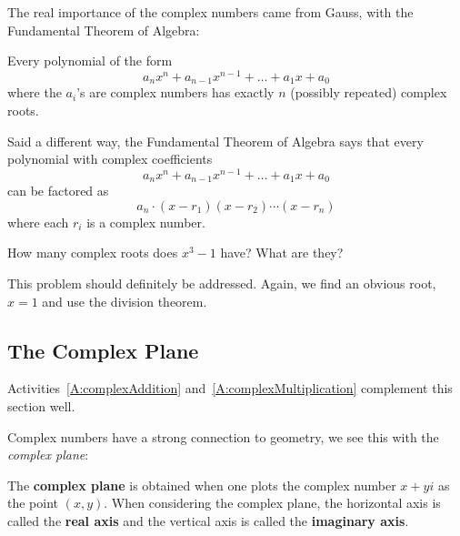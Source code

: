 The real importance of the complex numbers came from
Gauss, with the Fundamental Theorem of Algebra:

\begin{theorem}
 Every polynomial of the form
\[
 a_n x^n + a_{n-1} x^{n-1} + \dots + a_1 x + a_0
\]
where the $a_i$'s are complex numbers has exactly $n$ (possibly
repeated) complex roots.
\end{theorem}

Said a different way, the Fundamental Theorem of Algebra says that
every polynomial with complex coefficients
\[
a_n x^n + a_{n-1} x^{n-1} + \dots + a_1 x + a_0
\]
can be factored as 
\[
a_n\cdot (x-r_1)(x-r_2) \cdots (x-r_n)
\]
where each $r_i$ is a complex number.

\begin{question} 
How many complex roots does $x^3-1$ have? What are they?
\end{question}
\QM

\begin{teachingnote}
This problem should definitely be addressed. Again, we find an
obvious root, $x=1$ and use the division theorem.
\end{teachingnote}



\subsection{The Complex Plane}


\begin{activitynote}
Activities~\ref{A:complexAddition} and~\ref{A:complexMultiplication}
complement this section well.
\end{activitynote}

Complex numbers have a strong connection to geometry, we see this with
the \textit{complex plane}:

\begin{definition}
The \textbf{complex plane} is obtained when one
plots the complex number $x + yi$ as the point $(x,y)$. When
considering the complex plane, the horizontal axis is called the
\textbf{real axis} and the vertical axis is called the
\textbf{imaginary axis}.
\end{definition}

